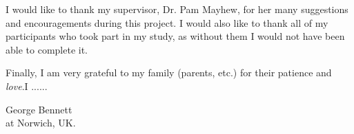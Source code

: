 
\def\baselinestretch{1.0}


I would like to thank my supervisor, Dr. Pam Mayhew, for her
many suggestions and encouragements during this project. I would also like to thank all of my participants who took part in my study, as without them I would not have been able to complete it. 

\medskip

\noindent
Finally, I am very grateful to my family (parents,
etc.) for their patience and {\em love}.I ......

\bigskip\medskip

\noindent
\hfill George Bennett \\
\hfill at Norwich, UK.\\


